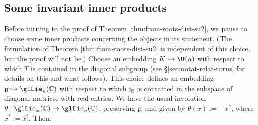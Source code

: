 \documentclass[reqno]{amsart} 
\begin{document}
\subsection{Some invariant inner products}\label{sec:some-invariant-inner}
Before turning to the proof of Theorem \ref{thm:from-roots-dist-su2}, we pause to choose some inner products concerning the objects in its statement.  (The formulation of Theorem \ref{thm:from-roots-dist-su2} is independent of this choice, but the proof will not be.)  Choose an embedding $K \hookrightarrow \U(n)$ with respect to which $T$ is contained in the diagonal subgroup (see \S\ref{sec:notat-relat-torus} for details on this and what follows).  This choice defines an embedding $\mathfrak{g} \hookrightarrow \glLie_n(\mathbb{C})$ with respect to which $\mathfrak{t}_{\mathbb{R}}$ is contained in the subspace of diagonal matricse with real entries.  We have the usual involution $\theta : \glLie_n(\mathbb{C}) \rightarrow \glLie_n(\mathbb{C})$, preserving $\mathfrak{g}$, and given by $\theta(x) := - x^*$, where $x^* := \overline{x}^t$.  Then:
\end{document}
